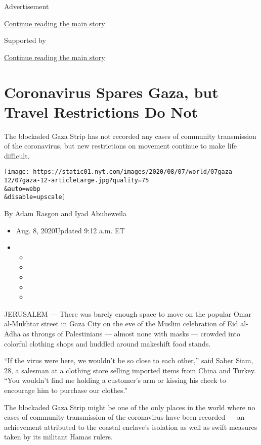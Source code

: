 Advertisement

\protect\hyperlink{after-top}{Continue reading the main story}

Supported by

\protect\hyperlink{after-sponsor}{Continue reading the main story}

\hypertarget{coronavirus-spares-gaza-but-travel-restrictions-do-not}{%
\section{Coronavirus Spares Gaza, but Travel Restrictions Do
Not}\label{coronavirus-spares-gaza-but-travel-restrictions-do-not}}

The blockaded Gaza Strip has not recorded any cases of community
transmission of the coronavirus, but new restrictions on movement
continue to make life difficult.

\texttt{[image: https://static01.nyt.com/images/2020/08/07/world/07gaza-12/07gaza-12-articleLarge.jpg?quality=75\\\&auto=webp\\\&disable=upscale]}

By Adam Rasgon and Iyad Abuheweila

\begin{itemize}
\item
  Aug. 8, 2020Updated 9:12 a.m. ET
\item
  \begin{itemize}
  \item
  \item
  \item
  \item
  \item
  \end{itemize}
\end{itemize}

JERUSALEM --- There was barely enough space to move on the popular Omar
al-Mukhtar street in Gaza City on the eve of the Muslim celebration of
Eid al-Adha as throngs of Palestinians --- almost none with masks ---
crowded into colorful clothing shops and huddled around makeshift food
stands.

``If the virus were here, we wouldn't be so close to each other,'' said
Saber Siam, 28, a salesman at a clothing store selling imported items
from China and Turkey. ``You wouldn't find me holding a customer's arm
or kissing his cheek to encourage him to purchase our clothes.''

The blockaded Gaza Strip might be one of the only places in the world
where no cases of community transmission of the coronavirus have been
recorded --- an achievement attributed to the coastal enclave's
isolation as well as swift measures taken by its militant Hamas rulers.

